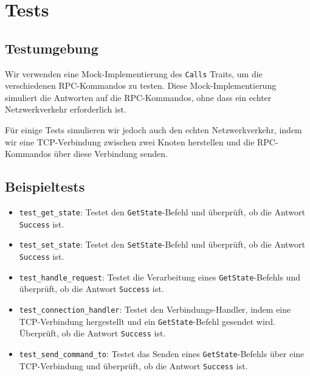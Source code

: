 \section{Tests}

\subsection{Testumgebung}

Wir verwenden eine Mock-Implementierung des \texttt{Calls} Traits, um die verschiedenen RPC-Kommandos zu testen. Diese Mock-Implementierung simuliert die Antworten auf die RPC-Kommandos, ohne dass ein echter Netzwerkverkehr erforderlich ist.

Für einige Tests simulieren wir jedoch auch den echten Netzwerkverkehr,
 indem wir eine TCP-Verbindung zwischen zwei Knoten herstellen und die RPC-Kommandos über diese Verbindung senden.

\subsection{Beispieltests}

\begin{itemize}
    \item \texttt{test\_get\_state}: Testet den \texttt{GetState}-Befehl und überprüft, ob die Antwort \texttt{Success} ist.
    \item \texttt{test\_set\_state}: Testet den \texttt{SetState}-Befehl und überprüft, ob die Antwort \texttt{Success} ist.
    \item \texttt{test\_handle\_request}: Testet die Verarbeitung eines \texttt{GetState}-Befehls und überprüft, ob die Antwort \texttt{Success} ist.
    \item \texttt{test\_connection\_handler}: Testet den Verbindungs-Handler, indem eine TCP-Verbindung hergestellt und ein \texttt{GetState}-Befehl gesendet wird. Überprüft, ob die Antwort \texttt{Success} ist.
    \item \texttt{test\_send\_command\_to}: Testet das Senden eines \texttt{GetState}-Befehls über eine TCP-Verbindung und überprüft, ob die Antwort \texttt{Success} ist.
\end{itemize}